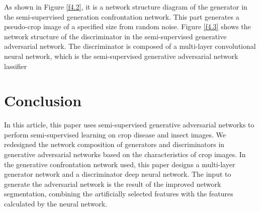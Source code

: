 \documentclass[11pt,en]{elegantpaper}
\begin{document}
As shown in Figure \ref{f4.2}, it is a network structure diagram of the generator in the semi-supervised generation confrontation network. This part generates a pseudo-crop image of a specified size from random noise. Figure \ref{f4.3} shows the network structure of the discriminator in the semi-supervised generative adversarial network. The discriminator is composed of a multi-layer convolutional neural network, which is the semi-supervised generative adversarial network lassifier

\section{Conclusion}
In this article, this paper uses semi-supervised generative adversarial networks to perform semi-supervised learning on crop disease and insect images. We redesigned the network composition of generators and discriminators in generative adversarial networks based on the characteristics of crop images. In the generative confrontation network used, this paper designs a multi-layer generator network and a discriminator deep neural network. The input to generate the adversarial network is the result of the improved network segmentation, combining the artificially selected features with the features calculated by the neural network.


\end{document}

